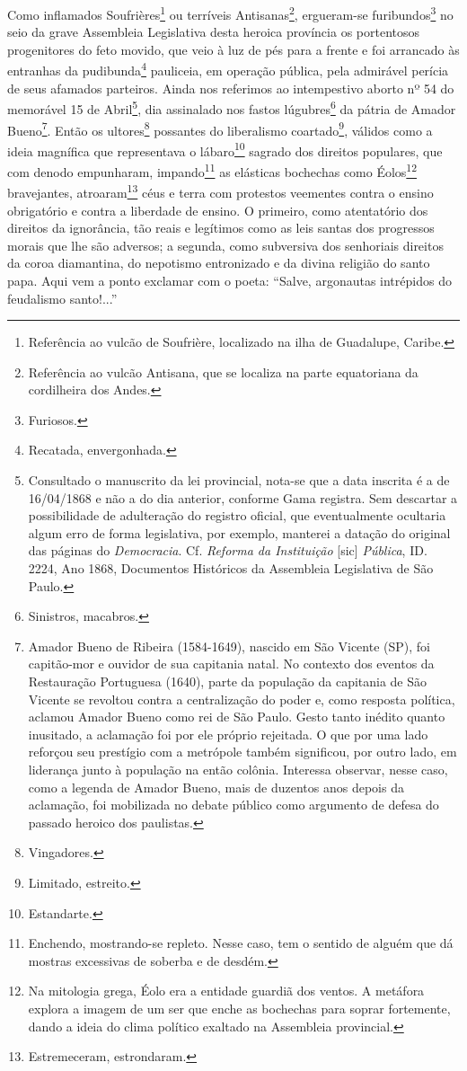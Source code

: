 \asterisc{}

Como inflamados Soufrières\footnote{Referência ao vulcão de Soufrière,
  localizado na ilha de Guadalupe, Caribe.} ou terríveis
Antisanas\footnote{Referência ao vulcão Antisana, que se localiza na
  parte equatoriana da cordilheira dos Andes.}, ergueram-se
furibundos\footnote{Furiosos.} no seio da grave Assembleia Legislativa
desta heroica província os portentosos progenitores do feto movido, que
veio à luz de pés para a frente e foi arrancado às entranhas da
pudibunda\footnote{Recatada, envergonhada.} pauliceia, em operação
pública, pela admirável perícia de seus afamados parteiros. Ainda nos
referimos ao intempestivo aborto nº 54 do memorável 15 de
Abril\footnote{Consultado o manuscrito da lei provincial, nota-se que
  a data inscrita é a de 16/04/1868 e não a do dia anterior, conforme
  Gama registra. Sem descartar a possibilidade de adulteração do
  registro oficial, que eventualmente ocultaria algum erro de forma
  legislativa, por exemplo, manterei a datação do original das páginas
  do \emph{Democracia}. Cf. \emph{Reforma da Instituição} {[}sic{]}
  \emph{Pública}, ID. 2224, Ano 1868, Documentos Históricos da
  Assembleia Legislativa de São Paulo.}, dia assinalado nos fastos
lúgubres\footnote{Sinistros, macabros.} da pátria de Amador
Bueno\footnote{Amador Bueno de Ribeira (1584-1649), nascido em São
  Vicente (SP), foi capitão-mor e ouvidor de sua capitania natal. No
  contexto dos eventos da Restauração Portuguesa (1640), parte da
  população da capitania de São Vicente se revoltou contra a
  centralização do poder e, como resposta política, aclamou Amador Bueno
  como rei de São Paulo. Gesto tanto inédito quanto inusitado, a
  aclamação foi por ele próprio rejeitada. O que por uma lado reforçou
  seu prestígio com a metrópole também significou, por outro lado, em
  liderança junto à população na então colônia. Interessa observar,
  nesse caso, como a legenda de Amador Bueno, mais de duzentos anos
  depois da aclamação, foi mobilizada no debate público como argumento
  de defesa do passado heroico dos paulistas.}. Então os
ultores\footnote{Vingadores.} possantes do liberalismo
coartado\footnote{Limitado, estreito.}, válidos como a ideia magnífica
que representava o lábaro\footnote{Estandarte.} sagrado dos direitos
populares, que com denodo empunharam, impando\footnote{Enchendo,
  mostrando-se repleto. Nesse caso, tem o sentido de alguém que dá
  mostras excessivas de soberba e de desdém.} as elásticas bochechas
como Éolos\footnote{Na mitologia grega, Éolo era a entidade guardiã
  dos ventos. A metáfora explora a imagem de um ser que enche as
  bochechas para soprar fortemente, dando a ideia do clima político
  exaltado na Assembleia provincial.} bravejantes, atroaram\footnote{
  Estremeceram, estrondaram.} céus e terra com protestos veementes
contra o ensino obrigatório e contra a liberdade de ensino. O primeiro,
como atentatório dos direitos da ignorância, tão reais e legítimos como
as leis santas dos progressos morais que lhe são adversos; a segunda,
como subversiva dos senhoriais direitos da coroa diamantina, do
nepotismo entronizado e da divina religião do santo papa. Aqui vem a
ponto exclamar com o poeta: ``Salve, argonautas intrépidos do feudalismo
santo!...''

